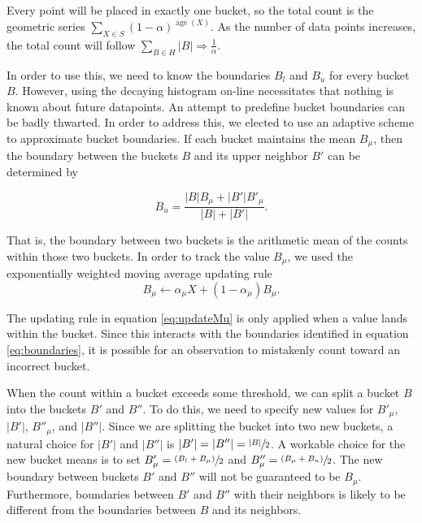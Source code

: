 \documentclass{sig-alternate}
\DeclareMathOperator{\age}{age}
\begin{document}
    Every point will be placed in exactly one bucket, so the total count is the
    geometric series $\sum_{X \in S} (1 - \alpha)^{\age(X)}$. As the number
    of data points increases, the total count will follow $\sum_{B \in H} |B|
    \Rightarrow \frac{1}{\alpha}$.

    In order to use this, we need to know the boundaries $B_l$ and $B_u$ for
    every bucket $B$. However, using the decaying histogram on-line necessitates
    that nothing is known about future datapoints. An attempt to predefine
    bucket boundaries can be badly thwarted. In order to address this, we
    elected to use an adaptive scheme to approximate bucket boundaries. If each
    bucket maintains the mean $B_{\mu}$, then the boundary between the
    buckets $B$ and its upper neighbor $B'$ can be determined by

    \begin{equation}
    \label{eq:boundaries}
        B_u =
            \frac{|B| B_{\mu} + |B'| B'_{\mu}}
                 {|B| + |B'|}.
    \end{equation}

    That is, the boundary between two buckets is the arithmetic mean of the
    counts within those two buckets. In order to track the value $B_{\mu}$, we
    used the exponentially weighted moving average updating rule
    \begin{equation}
    \label{eq:updateMu}
        B_{\mu} \leftarrow \alpha_{\mu} X + (1 - \alpha_{\mu}) B_{\mu}.
    \end{equation}

    The updating rule in equation \ref{eq:updateMu} is only applied when a value
    lands within the bucket. Since this interacts with the boundaries identified
    in equation \ref{eq:boundaries}, it is possible for an observation to
    mistakenly count toward an incorrect bucket.

    When the count within a bucket exceeds some threshold, we can split
    a bucket $B$ into the buckets $B'$ and $B''$. To do this, we need to
    specify new values for $B'_{\mu}$, $|B'|$, $B''_{\mu}$, and
    $|B''|$. Since we are splitting the bucket into two new buckets, a
    natural choice for $|B'|$ and $|B''|$ is $|B'| = |B''| = \sfrac{|B|}{2}$.
    A workable choice for the new bucket means is to set ${B'_{\mu} = \sfrac{(B_l
    + B_{\mu})}{2}}$ and ${B''_{\mu} = \sfrac{(B_{\mu} + B_u)}{2}}$.
    The new boundary between buckets $B'$ and $B''$ will not be
    guaranteed to be $B_{\mu}$. Furthermore, boundaries between $B'$ and $B''$
    with their neighbors is likely to be different from the boundaries between
    $B$ and its neighbors.
\end{document}

